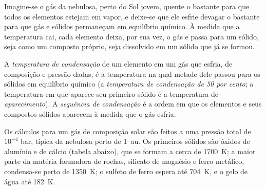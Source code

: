 Imagine-se o gás da nebulosa, perto do Sol jovem, quente o bastante para que todos os
elementos estejam em vapor, e deixe-se que ele esfrie devagar o bastante para que gás e sólidos
permaneçam em equilíbrio químico. À medida que a temperatura cai, cada elemento
deixa, por sua vez, o gás e passa para um sólido, seja como um composto próprio, seja
dissolvido em um sólido que já se formou.

\begin{definition}
\label{def:b2:planet-formation-meteorites:condensation}
A \emph{temperatura de condensação} de um
elemento em um gás que esfria, de composição e pressão dadas, é a temperatura
na qual metade dele passou para os sólidos em equilíbrio químico (a
\emph{temperatura de condensação de 50 por cento}; a temperatura em que aparece seu primeiro
sólido é a temperatura de \emph{aparecimento}). A
\emph{sequência de condensação} é a ordem em que
os elementos e seus compostos sólidos aparecem à medida que o gás esfria.
\end{definition}

Os cálculos para um gás de composição solar são feitos a uma pressão total de
$10^{-4}$ bar, típica da nebulosa perto de \qty{1}{au}. Os primeiros sólidos são
óxidos de alumínio e de cálcio (tabela abaixo), que se formam a cerca de
\qty{1700}{K}; a maior parte da matéria formadora de rochas, silicato de magnésio e
ferro metálico, condensa-se perto de \qty{1350}{K}; o sulfeto de ferro espera até
\qty{704}{K}, e o gelo de água até \qty{182}{K}.


